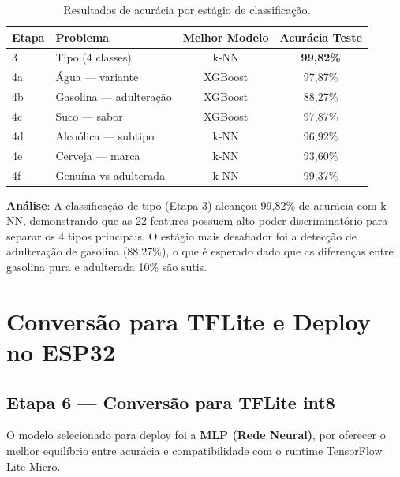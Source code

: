 \documentclass[12pt, a4paper]{article}
\begin{document}
\begin{table}[H]
  \centering
  \caption{Resultados de acur\'{a}cia por est\'{a}gio de classifica\c{c}\~{a}o.}
  \label{tab:resultados}
  \begin{tabular}{llcc}
    \toprule
    \textbf{Etapa} & \textbf{Problema} & \textbf{Melhor Modelo} & \textbf{Acur\'{a}cia Teste} \\
    \midrule
    3  & Tipo (4 classes)          & k-NN      & \textbf{99,82\%} \\
    4a & \'{A}gua --- variante         & XGBoost   & 97,87\% \\
    4b & Gasolina --- adultera\c{c}\~{a}o  & XGBoost   & 88,27\% \\
    4c & Suco --- sabor              & XGBoost   & 97,87\% \\
    4d & Alco\'{o}lica --- subtipo       & k-NN      & 96,92\% \\
    4e & Cerveja --- marca           & k-NN      & 93,60\% \\
    4f & Genu\'{i}na vs adulterada     & k-NN      & 99,37\% \\
    \bottomrule
  \end{tabular}
\end{table}

\textbf{An\'{a}lise}: A classifica\c{c}\~{a}o de tipo (Etapa 3) alcan\c{c}ou 99,82\% de acur\'{a}cia com k-NN, demonstrando que as 22 features possuem alto poder discriminat\'{o}rio para separar os 4 tipos principais. O est\'{a}gio mais desafiador foi a detec\c{c}\~{a}o de adultera\c{c}\~{a}o de gasolina (88,27\%), o que \'{e} esperado dado que as diferen\c{c}as entre gasolina pura e adulterada 10\% s\~{a}o sutis.

\section{Convers\~{a}o para TFLite e Deploy no ESP32}

\subsection{Etapa 6 --- Convers\~{a}o para TFLite int8}

O modelo selecionado para deploy foi a \textbf{MLP (Rede Neural)}, por oferecer o melhor equil\'{i}brio entre acur\'{a}cia e compatibilidade com o runtime TensorFlow Lite Micro.
\end{document}
